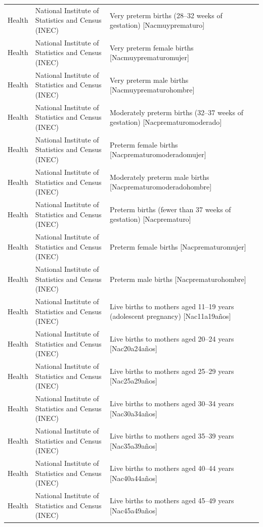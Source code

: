 \documentclass[10pt,a4paper]{article}
\begin{document}
\begin{longtable}{@{}>{\raggedright\arraybackslash}p{3.5cm}>{\raggedright\arraybackslash}p{5.6cm}>{\raggedright\arraybackslash}p{\dimexpr\textwidth-9.1cm-4\tabcolsep\relax}@{}}
Health & National Institute of Statistics and Census (INEC) & Very preterm births (28--32 weeks of gestation) [Nacmuyprematuro]\\
Health & National Institute of Statistics and Census (INEC) & Very preterm female births [Nacmuyprematuromujer]\\
Health & National Institute of Statistics and Census (INEC) & Very preterm male births [Nacmuyprematurohombre]\\
Health & National Institute of Statistics and Census (INEC) & Moderately preterm births (32--37 weeks of gestation) [Nacprematuromoderado]\\
Health & National Institute of Statistics and Census (INEC) & Preterm female births [Nacprematuromoderadomujer]\\
Health & National Institute of Statistics and Census (INEC) & Moderately preterm male births [Nacprematuromoderadohombre]\\
Health & National Institute of Statistics and Census (INEC) & Preterm births (fewer than 37 weeks of gestation) [Nacprematuro]\\
Health & National Institute of Statistics and Census (INEC) & Preterm female births [Nacprematuromujer]\\
Health & National Institute of Statistics and Census (INEC) & Preterm male births [Nacprematurohombre]\\
Health & National Institute of Statistics and Census (INEC) & Live births to mothers aged 11--19 years (adolescent pregnancy) [Nac11a19a\~{n}os]\\
Health & National Institute of Statistics and Census (INEC) & Live births to mothers aged 20--24 years [Nac20a24a\~{n}os]\\
Health & National Institute of Statistics and Census (INEC) & Live births to mothers aged 25--29 years [Nac25a29a\~{n}os]\\
Health & National Institute of Statistics and Census (INEC) & Live births to mothers aged 30--34 years [Nac30a34a\~{n}os]\\
Health & National Institute of Statistics and Census (INEC) & Live births to mothers aged 35--39 years [Nac35a39a\~{n}os]\\
Health & National Institute of Statistics and Census (INEC) & Live births to mothers aged 40--44 years [Nac40a44a\~{n}os]\\
Health & National Institute of Statistics and Census (INEC) & Live births to mothers aged 45--49 years [Nac45a49a\~{n}os]\\

\end{longtable}
\end{document}
